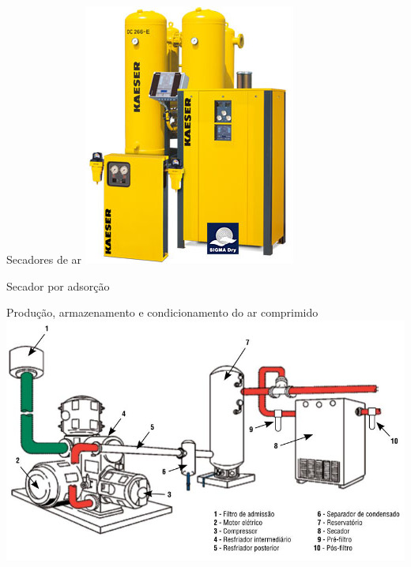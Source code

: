 \begin{frame}{Secadores de ar}
	\centering
	\includegraphics[height=0.8\textheight]{Figuras/Ch13/fig8}
	
	Secador por adsorção
\end{frame}


\begin{frame}{Produção, armazenamento e condicionamento do ar comprimido}
	\centering
	\includegraphics[width=1\linewidth]{Figuras/Ch13/fig9}
\end{frame}


